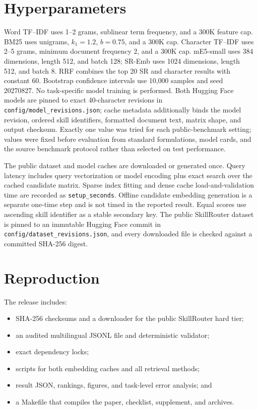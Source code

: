 \documentclass[letterpaper]{article}
\begin{document}
\section{Hyperparameters}

Word TF--IDF uses 1--2 grams, sublinear term frequency, and a 300K feature
cap.  BM25 uses unigrams, $k_1=1.2$, $b=0.75$, and a 300K cap.  Character
TF--IDF uses 2--5 grams, minimum document frequency 2, and a 300K cap.
mE5-small uses 384 dimensions, length 512, and batch 128; SR-Emb uses 1024
dimensions, length 512, and batch 8.  RRF combines the top 20 SR and character
results with constant 60.  Bootstrap confidence intervals use 10,000 samples
and seed 20270827.  No task-specific model training is performed.
Both Hugging Face models are pinned to exact 40-character revisions in
\texttt{config/model\_revisions.json}; cache metadata additionally binds the
model revision, ordered skill identifiers, formatted document text, matrix
shape, and output checksum.
Exactly one value was tried for each public-benchmark setting; values were
fixed before evaluation from standard formulations, model cards, and the
source benchmark protocol rather than selected on test performance.

The public dataset and model caches are downloaded or generated once.  Query
latency includes query vectorization or model encoding plus exact search over
the cached candidate matrix.  Sparse index fitting and dense cache
load-and-validation time are recorded as \texttt{setup\_seconds}.  Offline
candidate embedding generation is a separate one-time step and is not timed in
the reported result.  Equal scores use ascending skill identifier as a stable
secondary key.
The public SkillRouter dataset is pinned to an immutable Hugging Face commit in
\texttt{config/dataset\_revisions.json}, and every downloaded file is checked
against a committed SHA-256 digest.

\section{Reproduction}

The release includes:
\begin{itemize}
  \item SHA-256 checksums and a downloader for the public SkillRouter hard tier;
  \item an audited multilingual JSONL file and deterministic validator;
  \item exact dependency locks;
  \item scripts for both embedding caches and all retrieval methods;
  \item result JSON, rankings, figures, and task-level error analysis; and
  \item a Makefile that compiles the paper, checklist, supplement, and archives.
\end{itemize}
\end{document}
